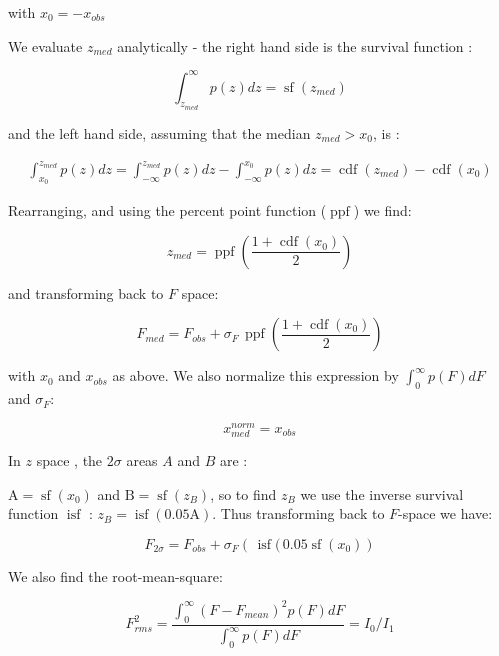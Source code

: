 \documentclass[fleqn,usenatbib]{mnras}  %
\DeclareMathOperator\cdf{cdf}
\DeclareMathOperator\sf{sf}
\DeclareMathOperator\isf{isf}
\DeclareMathOperator\ppf{ppf}
\begin{document}
with  $x_{0}=-x_{obs}$

\bigskip

We evaluate $z_{med}$ analytically  - the right hand side is the survival function  : 

\begin{equation}
\int_{z_{med}}^{\infty}{p(z)dz} = \sf(z_{med})
\end{equation}

and the left hand side, assuming that the median $z_{med} > x_{0}$, is :

\begin{multline}
\int_{x_{0}}^{z_{med}}{p(z)dz} = \int_{-\infty}^{z_{med}}{p(z)dz} - \int_{-\infty}^{x_{0}}{p(z)dz} = \cdf(z_{med}) - \cdf(x_{0})
\end{multline}

Rearranging, and using the percent point function ($\ppf$)  we find:

\begin{equation}
z_{med} = \ppf \left( \frac{1+\cdf(x_{0})}{2} \right)
\end{equation}

and transforming back to $F$ space: 

\begin{equation}
F_{med} = F_{obs} + \sigma_{F} \, \ppf \left( \frac{1+\cdf(x_{0})}{2} \right)
\end{equation}

with $x_{0}$ and $x_{obs}$ as above.  We also normalize this expression by $\int _{0} ^ {\infty}{ p(F) dF}$ and $\sigma_{F}$:

\begin{equation}
x_{med}^{norm} = x_{obs}
\end{equation}


\bigskip

In $z$  space , the $2\sigma$ areas  $A$ and $B$ are :

$\text{A} = \sf(x_{0})$ and $\text{B} = \sf(z_{B})$, so to find  $z_{B}$ we use the  inverse survival function $\isf$ : $z_{B} = \isf(0.05 \text{A})$. Thus transforming back to $F$-space we have:

\begin{equation}
F_{2\sigma} = F_{obs} + \sigma_{F} \left(\, \isf (\, 0.05 \sf (x_{0})  \right)
\end{equation}

\bigskip

We also find the root-mean-square:

\begin{equation}
F_{rms}^{2} = \frac{\int _{0} ^ {\infty}{(F-F_{mean})^{2} p(F) dF}}{\int _{0} ^ {\infty}{p(F) dF}} = I_{0} / I_{1}
\end{equation}
\end{document}
